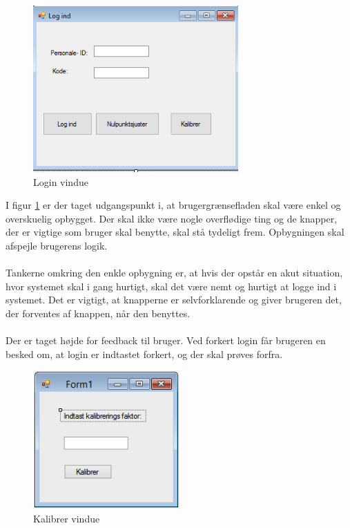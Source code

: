 \begin{figure}[H]
	\centering
	\includegraphics[width=0.7\textwidth]{Figurer/GUI/Logind_GUI}
	\caption{Login vindue}
	\label{Login vindue}
\end{figure}

I figur \ref{Login vindue} er der taget udgangspunkt i, at brugergrænsefladen skal være enkel og overskuelig opbygget. Der skal ikke være nogle overflødige ting og de knapper, der er vigtige som bruger skal benytte, skal stå tydeligt frem. Opbygningen skal afspejle brugerens logik.\\ \\ 
Tankerne omkring den enkle opbygning er, at hvis der opstår en akut situation, hvor systemet skal i gang hurtigt, skal det være nemt og hurtigt at logge ind i systemet. Det er vigtigt, at knapperne er selvforklarende og giver brugeren det, der forventes af knappen, når den benyttes. \\ \\
Der er taget højde for feedback til bruger. Ved forkert login får brugeren en besked om, at login er indtastet forkert, og der skal prøves forfra. \\


\begin{figure}[H]
	\centering
	\includegraphics[width=0.5\textwidth]{Figurer/GUI/kalibrerGUI}
	\caption{Kalibrer vindue}
	\label{Kaliber vindue}
\end{figure}

